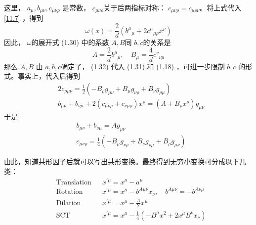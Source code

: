 	这里， $a_\mu,b_{\mu\nu},c_{\mu\nu\rho}$ 是常数， $c_{\mu\nu\rho} $关于后两指标对称： $c_{\mu \nu \rho}=c_{\mu \rho \nu} $。将上式代入 \ref{11.7} ，得到
	\begin{equation}
		\omega(x)=\frac{2}{d}\left(b^{\mu}{}_{\mu}+2 c^{\mu}{}_{\mu \rho} x^{\rho}\right)
	\end{equation}
	因此， $\omega $的展开式 (1.30) 中的系数 $A,B $同 $b,c $的关系是
	\begin{equation}
		A=\frac{2}{d} b^{\mu}{}_{\mu}, \quad B_{\mu}=\frac{4}{d} c^{\nu}{}_{\nu \mu}
	\end{equation}
	那么 $A,B$ 由 $a,b,c $确定了， (1.32) 代入 (1.31) 和 (1.18) ，可进一步限制 $b,c$ 的形式。事实上，代入后得到
	\begin{align} &2 c_{\rho \mu \nu}=\frac{1}{2}\left(-B_{\rho} g_{\mu \nu}+B_{\mu} g_{\nu \rho}+B_{\nu} g_{\rho \mu}\right)\\ &b_{\mu \nu}+b_{\nu \mu}+2\left(c_{\mu \nu \rho}+c_{\nu \mu \rho}\right) x^{\rho}=\left(A+B_{\rho} x^{\rho}\right) g_{\mu \nu} \end{align}
	于是
	\begin{align} &b_{\mu \nu}+b_{\nu \mu}=A g_{\mu \nu}\\ &c_{\mu \nu \rho}=\frac{1}{4}\left(-B_{\mu} g_{\nu \rho}+B_{\nu} g_{\rho \mu}+B_{\rho} g_{\mu \nu}\right) \end{align}
	
	由此，知道共形因子后就可以写出共形变换。最终得到无穷小变换可分成以下几类：
	\begin{equation}
		\boxed{
		\begin{aligned}
				&\text{Translation}&&x^{\prime \mu}=x^{\mu}-a^{\mu}\\
				&\text{Rotation}&&x^{\prime \mu}=x^{\mu}-b^{A \mu \nu} x_{\nu}, \quad b^{A \mu \nu}=-b^{A \nu \mu}\\
				&\text{Dilation}&&x^{\prime \mu}=x^{\mu}-\frac{A}{2} x^{\mu}\\
				&\text{SCT}&&x^{\prime \mu}=x^{\mu}-\frac{1}{4}\left(-B^{\mu} x^{2}+2 x^{\mu} B^{\nu} x_{\nu}\right)
		\end{aligned}
	}
	\end{equation}
	
